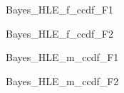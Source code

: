 \documentclass[a4j,11pt,mc, twocolumn]{jreport}
\begin{document}


	\begin{figure}[h!]
		\begin{center}
				\caption{Bayes\_HLE\_f\_ccdf\_F1}
		\end{center}
	\end{figure}



	\begin{figure}[h!]
		\begin{center}
				\caption{Bayes\_HLE\_f\_ccdf\_F2}
		\end{center}
	\end{figure}



	\begin{figure}[h!]
		\begin{center}
				\caption{Bayes\_HLE\_m\_ccdf\_F1}
		\end{center}
	\end{figure}



	\begin{figure}[h!]
		\begin{center}
				\caption{Bayes\_HLE\_m\_ccdf\_F2}
		\end{center}
	\end{figure}
\end{document}
